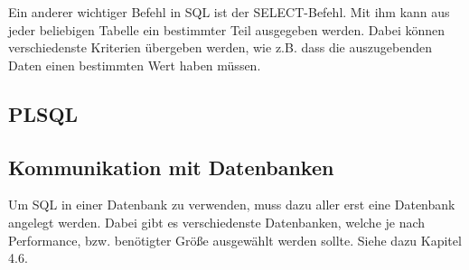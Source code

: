 Ein anderer wichtiger Befehl in SQL ist der SELECT-Befehl. Mit ihm kann aus jeder beliebigen Tabelle ein bestimmter Teil ausgegeben werden. Dabei können verschiedenste Kriterien übergeben werden, wie z.B. dass die auszugebenden Daten einen bestimmten Wert haben müssen.
 
\subsection{PLSQL}
 
\subsection{Kommunikation mit Datenbanken}
Um SQL in einer Datenbank zu verwenden, muss dazu aller erst eine Datenbank angelegt werden. Dabei gibt es verschiedenste Datenbanken, welche je nach Performance, bzw. benötigter Größe ausgewählt werden sollte. Siehe dazu Kapitel 4.6.
 
 
